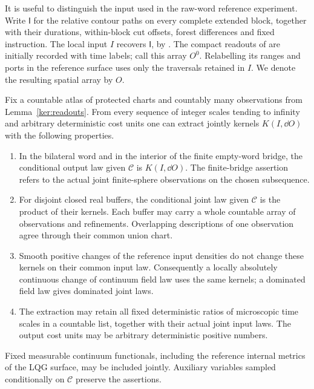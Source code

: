 It is useful to distinguish the input used in the raw-word reference
experiment. Write \(\mathsf I\) for the relative contour paths on every
complete extended block, together with their durations, within-block
cut offsets, forest
differences and fixed instruction. The local input \(I\) recovers
\(\mathsf I\), by . The compact readouts of
 are initially recorded with time labels; call this
array \(O^0\). Relabelling its ranges and ports in the reference surface
uses only the traversals retained in \(I\). We denote the resulting
spatial array by \(O\).

\begin{theorem}\label{ker:local-kernels}
Fix a countable atlas of protected charts and countably many
observations from Lemma~\ref{ker:readouts}.  From every sequence of
integer scales tending to infinity and arbitrary deterministic cost
units one can extract jointly kernels \(K(I,\dd O)\) with the following
properties.
\begin{enumerate}
\item In the bilateral word and in the interior of the finite
empty-word bridge, the conditional output law given \(\mathcal C\)
is \(K(I,\dd O)\).  The finite-bridge assertion refers to the actual
joint finite-sphere observations on the chosen subsequence.
\item For disjoint closed real buffers, the conditional joint law
given \(\mathcal C\) is the product of their kernels.  Each buffer may
carry a whole countable array of observations and refinements.
Overlapping descriptions of one observation agree through their
common union chart.
\item Smooth positive changes of the reference input densities do
not change these kernels on their common input law.  Consequently a
locally absolutely continuous change of continuum field law uses the
same kernels; a dominated field law gives dominated joint laws.
\item The extraction may retain all fixed deterministic ratios of
microscopic time scales in a countable list, together with their
actual joint input laws. The output cost units may be arbitrary
deterministic positive numbers.
\end{enumerate}
Fixed measurable continuum functionals, including the reference
internal metrics of the LQG surface, may be included jointly. Auxiliary
variables sampled conditionally on \(\mathcal C\) preserve the assertions.
\end{theorem}

